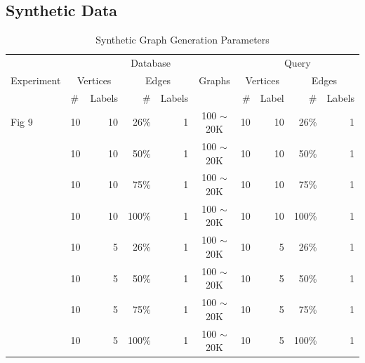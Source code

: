 \subsection{Synthetic Data}


\begin{table}
\begin{center}
\begin{tabular}{|l|l|r|r|r|c|r|r|r|r|}  \hline
\multirow{3}{*}{Experiment} & \multicolumn{5}{c|}{Database} & \multicolumn{4}{c|}{Query}  \\ \cline{2-2} \cline{3-3} \cline{4-4} \cline{5-5} \cline{6-6} \cline{7-7} \cline{8-8} \cline{9-9} \cline{10-10}
       & \multicolumn{2}{c|}{Vertices} & \multicolumn{2}{c|}{Edges} & Graphs & \multicolumn{2}{c|}{Vertices} & \multicolumn{2}{c|}{Edges} \\ \cline{2-2} \cline{3-3} \cline{4-4} \cline{5-5}  \cline{7-7} \cline{8-8} \cline{9-9} \cline{10-10} 
 & \#  & Labels & \# & Labels &  & \#  & Label & \# & Labels  \\ \hline
Fig 9 & 10 & 10 & 26\% & 1 & 100 $\sim$ 20K & 10 & 10 & 26\% & 1 \\ \hline
  & 10 & 10 & 50\% & 1 & 100 $\sim$ 20K & 10 & 10 & 50\% & 1 \\ \hline
 & 10 & 10 & 75\% & 1 & 100 $\sim$ 20K & 10 & 10 & 75\% & 1 \\ \hline
 & 10 & 10 & 100\% & 1 & 100 $\sim$  20K & 10 & 10 & 100\% & 1 \\ \hline
 & 10 & 5 & 26\% & 1 & 100 $\sim$  20K & 10 & 5 & 26\% & 1 \\ \hline
 & 10 & 5 & 50\% & 1 & 100 $\sim$  20K & 10 & 5 & 50\% & 1 \\ \hline
 & 10 & 5 & 75\% & 1 & 100 $\sim$  20K & 10 & 5 & 75\% & 1 \\ \hline
 & 10 & 5 & 100\% & 1 & 100 $\sim$ 20K & 10 & 5 & 100\% & 1 \\ \hline
\end{tabular}
\caption{ Synthetic Graph Generation Parameters \label{tab:parameterTable} }
\end{center}
\end{table}

